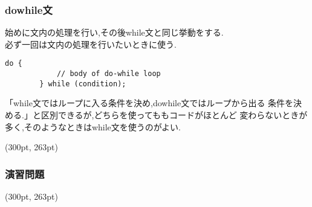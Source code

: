 \documentclass[dvipdfmx]{beamer}
\begin{document}
\subtitle{do while文}
\begin{frame}[c, fragile]
    \frametitle{do\space while文}
    始めに文内の処理を行い,その後while文と同じ挙動をする.\\
    必ず一回は文内の処理を行いたいときに使う.
    \begin{lstlisting}[gobble=6, caption=Syntax\space of\space do\space while\space loop, label=dowhile_howto]
        do {
            // body of do-while loop
        } while (condition);
    \end{lstlisting}
    「while文ではループに入る条件を決め,do\space while文ではループから出る
    条件を決める.」と区別できるが,どちらを使ってももコードがほとんど
    変わらないときが多く,そのようなときはwhile文を使うのがよい.
    \begin{textblock*}{0.3\linewidth}(300pt, 263pt)
    \space
    \end{textblock*}
\end{frame}

\begin{frame}[t, fragile]
    \frametitle{演習問題}
    \begin{textblock*}{0.3\linewidth}(300pt, 263pt)
    \space
    \end{textblock*}
\end{frame}
\end{document}
